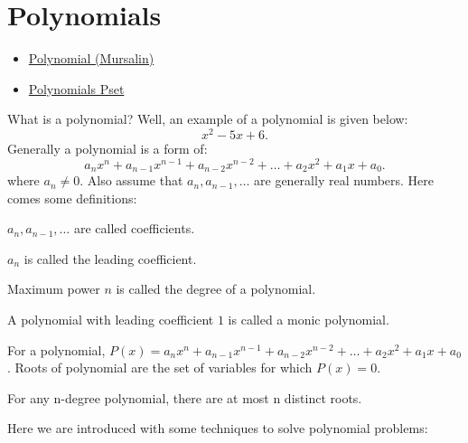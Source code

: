 \chapter{Polynomials}%

\begin{linkb}
   \begin{itemize}
        \item \href{https://www.youtube.com/watch?v=w52vpcuTAwo}{Polynomial (Mursalin)}
        \item \href{https://drive.google.com/file/d/1SoVQm_j-osYbXPg7ZHeS3hQdGCw9m0Yo/view}{Polynomials Pset}
   \end{itemize}
\end{linkb}


What is a polynomial? Well, an example of a polynomial is given below:
\[x^2-5x+6.\]
Generally a polynomial is a form of:
\[a_nx^n + a_{n-1}x^{n-1} + a_{n-2}x^{n-2}+ \ldots + a_2x^2 + a_1x + a_0 .\]
where $a_n\neq 0$. Also assume that $a_n, a_{n-1}, \ldots$ are generally real numbers. 
Here comes some definitions:
\begin{definition}[Coefficient]
$a_n,a_{n-1}, \ldots$ are called coefficients.
\end{definition}
\begin{definition}
$a_n$ is called the leading coefficient.
\end{definition}
\begin{definition}
Maximum power $n$ is called the degree of a polynomial.
\end{definition}
\begin{definition}
A polynomial with leading coefficient $1$ is called a monic polynomial.
\end{definition}
\begin{definition}
For a polynomial, $P(x)=a_nx^n + a_{n-1}x^{n-1} + a_{n-2}x^{n-2}+ \ldots + a_2x^2 + a_1x + a_0$. Roots of polynomial are the set of variables for which $P(x)=0$.
\end{definition}
\begin{theorem}
For any n-degree polynomial, there are at most n distinct roots.
\end{theorem}
Here we are introduced with some techniques to solve polynomial problems:

